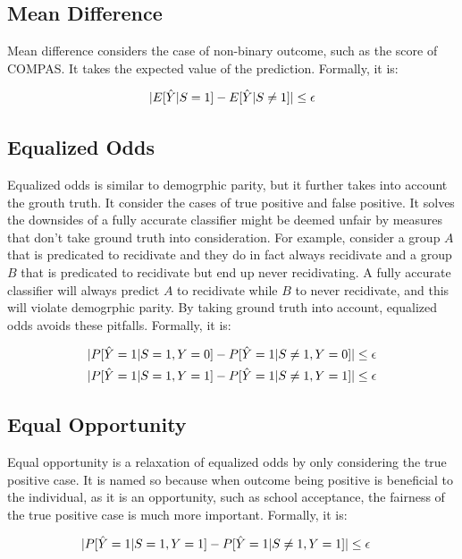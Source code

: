 \documentclass[conference]{IEEEtran}
\begin{document}
\subsection{Mean Difference}
Mean difference \cite{vzliobaite2017measuring} considers the case of non-binary outcome, such as the score of COMPAS. It takes the expected value of the prediction. Formally, it is:

\[
    \lvert E[\hat{Y}|S = 1] - E[\hat{Y}|S \neq 1]\rvert \leq \epsilon
\]

\subsection{Equalized Odds}
Equalized odds \cite{hardt2016equality} is similar to demogrphic parity, but it further takes into account the grouth truth. It consider the cases of true positive and false positive. It solves the downsides of a fully accurate classifier might be deemed unfair by measures that don't take ground truth into consideration. For example, consider a group $A$ that is predicated to recidivate and they do in fact always recidivate and a group $B$ that is predicated to recidivate but end up never recidivating. A fully accurate classifier will always predict $A$ to recidivate while $B$ to never recidivate, and this will violate demogrphic parity. By taking ground truth into account, equalized odds avoids these pitfalls. Formally, it is:

\begin{align*}
    \lvert P[\hat{Y} = 1 | S = 1, Y = 0] - P[\hat{Y} = 1 | S \neq 1, Y = 0]\rvert & \leq \epsilon \\
    \lvert P[\hat{Y} = 1 | S = 1, Y = 1] - P[\hat{Y} = 1 | S \neq 1, Y = 1]\rvert & \leq \epsilon
\end{align*}

\subsection{Equal Opportunity}
Equal opportunity \cite{hardt2016equality} is a relaxation of equalized odds by only considering the true positive case. It is named so because when outcome being positive is beneficial to the individual, as it is an opportunity, such as school acceptance, the fairness of the true positive case is much more important. Formally, it is:

\begin{align*}
    \lvert P[\hat{Y} = 1 | S = 1, Y = 1] - P[\hat{Y} = 1 | S \neq 1, Y = 1]\rvert & \leq \epsilon
\end{align*}
\end{document}
